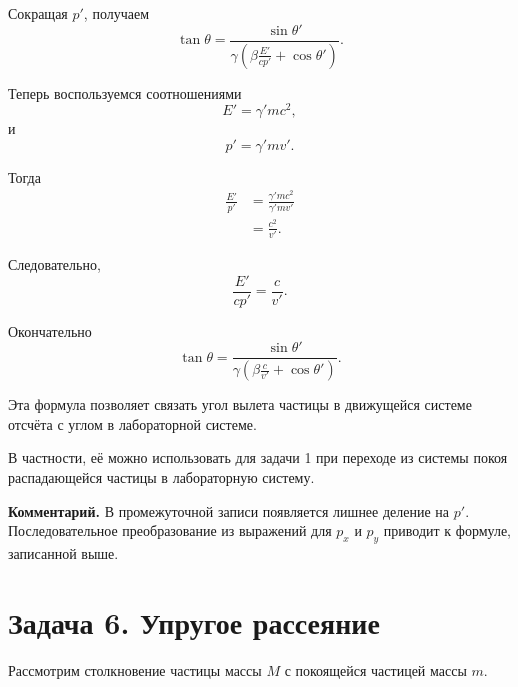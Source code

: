 \documentclass[../final.tex]{subfiles}
\begin{document}
Сокращая $p'$, получаем
%
\begin{equation*}
    \tan\theta
    =
    \frac{
        \sin\theta'
    }{
        \gamma
        \left(
            \beta\frac{E'}{cp'}
            +
            \cos\theta'
        \right)
    }.
\end{equation*}

Теперь воспользуемся соотношениями
%
\begin{equation*}
    E'
    =
    \gamma' mc^2,
\end{equation*}
%
и
%
\begin{equation*}
    p'
    =
    \gamma' mv'.
\end{equation*}

Тогда
%
\begin{align*}
    \frac{E'}{p'}
    &=
    \frac{
        \gamma'mc^2
    }{
        \gamma'mv'
    }
    \\[3pt]
    &=
    \frac{c^2}{v'}.
\end{align*}

Следовательно,
%
\begin{equation*}
    \frac{E'}{cp'}
    =
    \frac{c}{v'}.
\end{equation*}

Окончательно
%
\begin{equation*}
    \tan\theta
    =
    \frac{
        \sin\theta'
    }{
        \gamma
        \left(
            \beta\frac{c}{v'}
            +
            \cos\theta'
        \right)
    }.
\end{equation*}

Эта формула позволяет связать угол вылета частицы в движущейся
системе отсчёта с углом в лабораторной системе.

В частности, её можно использовать для задачи 1 при переходе
из системы покоя распадающейся частицы в лабораторную систему.

\textbf{Комментарий.}
В промежуточной записи появляется лишнее деление на $p'$.
Последовательное преобразование из выражений для $p_x$ и $p_y$
приводит к формуле, записанной выше.



\newpage
\section{Задача 6. Упругое рассеяние}

Рассмотрим столкновение частицы массы $M$
с покоящейся частицей массы $m$.
\end{document}
